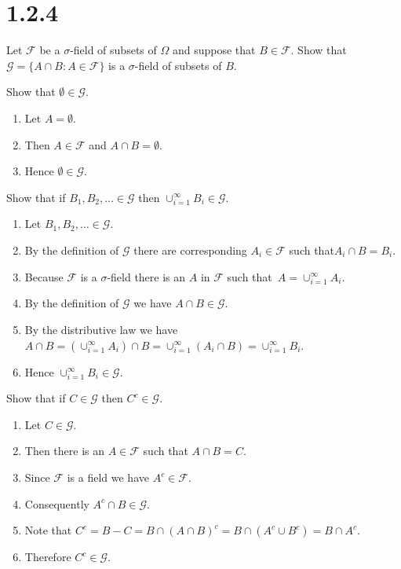 \section*{1.2.4}
Let $\mathcal F$ be a $\sigma$-field of subsets of $\Omega$ and suppose that $B\in\mathcal F$.
Show that ${\mathcal G}=\{A\cap B:A\in{\mathcal F}\}$ is a $\sigma$-field of subsets of $B$.

\bigskip
\noindent
Show that $\emptyset\in\mathcal G$.
\begin{enumerate}
\item Let $A=\emptyset$.
\item Then $A\in\mathcal F$ and $A\cap B=\emptyset$.
\item Hence $\emptyset\in\mathcal G$.
\end{enumerate}

\bigskip
\noindent
Show that if $B_1,B_2,\ldots\in\mathcal G$ then $\cup_{i=1}^\infty B_i\in\mathcal G$.
\begin{enumerate}
\item Let $B_1,B_2,\ldots\in\mathcal G$.
\item By the definition of $\mathcal G$ there are corresponding $A_i\in\mathcal F$
such that\break $A_i\cap B=B_i$.
\item Because $\mathcal F$ is a $\sigma$-field there is an $A$ in $\mathcal F$ such that\
$A=\cup_{i=1}^\infty A_i$.
\item By the definition of $\mathcal G$ we have $A\cap B\in\mathcal G$.
\item By the distributive law we have\hfill\break
$A\cap B=(\cup_{i=1}^\infty A_i)\cap B=\cup_{i=1}^\infty(A_i\cap B)
=\cup_{i=1}^\infty B_i$.
\item Hence $\cup_{i=1}^\infty B_i\in\mathcal G$.
\end{enumerate}

\bigskip
\noindent
Show that if $C\in\mathcal G$ then $C^c\in\mathcal G$.
\begin{enumerate}
\item Let $C\in\mathcal G$.
\item Then there is an $A\in\mathcal F$ such that $A\cap B=C$.
\item Since $\mathcal F$ is a field we have $A^c\in\mathcal F$.
\item Consequently $A^c\cap B\in\mathcal G$.
\item Note that $C^c=B-C=B\cap(A\cap B)^c=B\cap(A^c\cup B^c)=B\cap A^c$.
\item Therefore $C^c\in\mathcal G$.
\end{enumerate}

